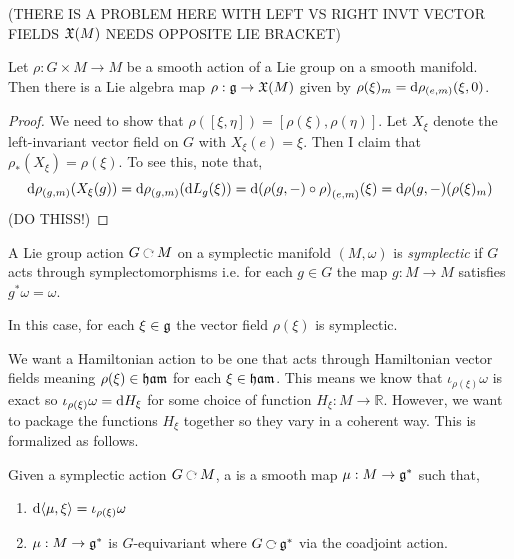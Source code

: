 \documentclass[12pt]{extarticle}
\newcommand{\R}{\mathbb{R}}
\begin{document}
(THERE IS A PROBLEM HERE WITH LEFT VS RIGHT INVT VECTOR FIELDS $\mathfrak{X}(M)$ NEEDS OPPOSITE LIE BRACKET) 

\begin{lemma}
Let $\rho : G \times M \to M$ be a smooth action of a Lie group on a smooth manifold. Then there is a Lie algebra map $\rho : \mathfrak{g} \to \mathfrak{X}(M)$ given by $\rho(\xi)_m = \mathrm{d}{\rho}_{(e, m)}(\xi, 0)$.
\end{lemma}

\begin{proof}
We need to show that $\rho([\xi,\eta]) = [\rho(\xi), \rho(\eta)]$. Let $X_\xi$ denote the left-invariant vector field on $G$ with $X_\xi(e) = \xi$. Then I claim that $\rho_*(X_\xi) = \rho(\xi)$. To see this, note that,
\[ \mathrm{d}{\rho}_{(g,m)}(X_\xi(g)) = \mathrm{d}{\rho}_{(g,m)}(\mathrm{d}{L_g}(\xi)) = \mathrm{d}{(\rho(g,-) \circ \rho)}_{(e,m)}(\xi) = \mathrm{d}{\rho(g,-)}(\rho(\xi)_m) \]
(DO THISS!)
\end{proof}

\begin{defn}
A Lie group action $G \acts M$ on a symplectic manifold $(M, \omega)$ is \textit{symplectic} if $G$ acts through symplectomorphisms i.e. for each $g \in G$ the map $g : M \to M$ satisfies $g^* \omega = \omega$.
\end{defn}

\begin{rmk}
In this case, for each $\xi \in \mathfrak{g}$ the vector field $\rho(\xi)$ is symplectic.
\end{rmk}

\begin{rmk}
We want a Hamiltonian action to be one that acts through Hamiltonian vector fields meaning $\rho(\xi) \in \mathfrak{ham}$ for each $\xi \in \mathfrak{ham}$. This means we know that $\iota_{\rho(\xi)} \omega$ is exact so $\iota_{\rho(\xi)} \omega = \mathrm{d}{H_\xi}$ for some choice of function $H_\xi : M \to \R$. However, we want to package the functions $H_\xi$ together so they vary in a coherent way. This is formalized as follows.
\end{rmk}

\begin{defn}
Given a symplectic action $G \acts M$, a  is a smooth map $\mu : M \to \mathfrak{g}^*$ such that,
\begin{enumerate}
\item $\mathrm{d}{\left< \mu , \xi \right>} = \iota_{\rho(\xi)} \omega$

\item $\mu : M \to \mathfrak{g}^*$ is $G$-equivariant where $G \acts \g^*$ via the coadjoint action.
\end{enumerate}
\end{defn}
\end{document}
